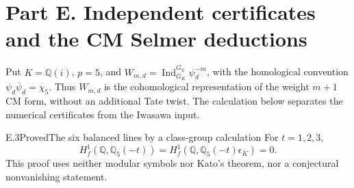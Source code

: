 \section*{Part E. Independent certificates and the CM Selmer deductions}

Put \(K=\mathbb Q(i)\), \(p=5\), and
\(W_{m,d}=\operatorname{Ind}_{G_K}^{G_{\mathbb Q}}\psi_d^{-m}\),
with the homological convention
\(\psi_d\overline\psi_d=\chi_5\). Thus \(W_{m,d}\) is the
cohomological representation of the weight \(m+1\) CM form,
without an additional Tate twist. The calculation below
separates the numerical certificates from the Iwasawa input.

\begin{statement}{E.3}{Proved}{The six balanced lines by a class-group calculation}
For \(t=1,2,3\),
\[
 H_f^1(\mathbb Q,\mathbb Q_5(-t))
 =H_f^1(\mathbb Q,\mathbb Q_5(-t)\epsilon_K)=0.
\]
This proof uses neither modular symbols nor Kato's theorem,
nor a conjectural nonvanishing statement.
\end{statement}
